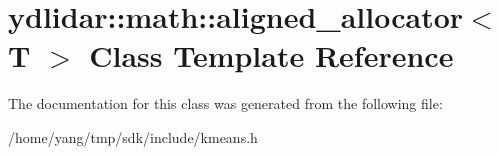 \hypertarget{classydlidar_1_1math_1_1aligned__allocator}{}\section{ydlidar\+:\+:math\+:\+:aligned\+\_\+allocator$<$ T $>$ Class Template Reference}
\label{classydlidar_1_1math_1_1aligned__allocator}


The documentation for this class was generated from the following file\+:\begin{DoxyCompactItemize}
\item 
/home/yang/tmp/sdk/include/kmeans.\+h\end{DoxyCompactItemize}

